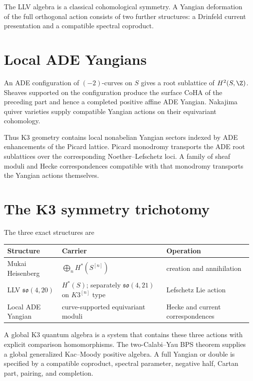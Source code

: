 The LLV algebra is a classical cohomological symmetry. A Yangian deformation of the full orthogonal action consists of two further structures: a Drinfeld current presentation and a compatible spectral coproduct.

\chapter{Local ADE Yangians}
An ADE configuration of $(-2)$-curves on $S$ gives a root sublattice of $H^2(S,\Z)$. Sheaves supported on the configuration produce the surface CoHA of the preceding part and hence a completed positive affine ADE Yangian. Nakajima quiver varieties supply compatible Yangian actions on their equivariant cohomology.

Thus K3 geometry contains local nonabelian Yangian sectors indexed by ADE enhancements of the Picard lattice. Picard monodromy transports the ADE root sublattices over the corresponding Noether--Lefschetz loci. A family of sheaf moduli and Hecke correspondences compatible with that monodromy transports the Yangian actions themselves.

\chapter{The K3 symmetry trichotomy}
The three exact structures are
\begin{center}
\small
\begin{tabularx}{0.96\textwidth}{@{}>{\raggedright\arraybackslash}p{}>{\raggedright\arraybackslash}X>{\raggedright\arraybackslash}p{}@{}}
\toprule
\textbf{Structure}&\textbf{Carrier}&\textbf{Operation}\\
\midrule
Mukai Heisenberg&$\bigoplus_nH^*(S^{[n]})$&creation and annihilation\\
LLV $\mathfrak{so}(4,20)$&$H^*(S)$; separately $\mathfrak{so}(4,21)$ on $K3^{[n]}$ type&Lefschetz Lie action\\
Local ADE Yangian&curve-supported equivariant moduli&Hecke and current correspondences\\
\bottomrule
\end{tabularx}
\end{center}
A global K3 quantum algebra is a system that contains these three actions with explicit comparison homomorphisms. The two-Calabi--Yau BPS theorem supplies a global generalized Kac--Moody positive algebra. A full Yangian or double is specified by a compatible coproduct, spectral parameter, negative half, Cartan part, pairing, and completion.

